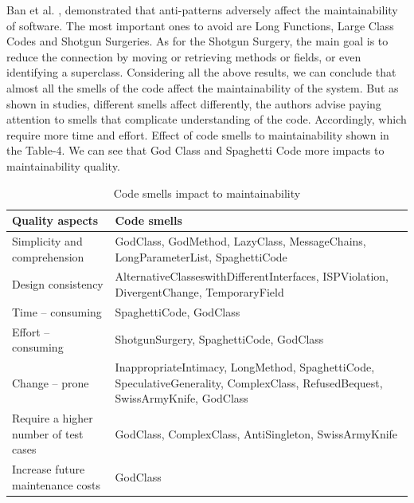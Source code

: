 \documentclass{sigchi}
\begin{document}
Ban et al. \cite{Ban}, demonstrated that anti-patterns adversely affect the maintainability of software. The most important ones to avoid are Long Functions, Large Class Codes and Shotgun Surgeries. As for the Shotgun Surgery, the main goal is to reduce the connection by moving or retrieving methods or fields, or even identifying a superclass.
Considering all the above results, we can conclude that almost all the smells of the code affect the maintainability of the system. But as shown in studies, different smells affect differently, the authors advise paying attention to smells that complicate understanding of the code. Accordingly, which require more time and effort. Effect of code smells to maintainability shown in the Table-4. We can see that God Class and Spaghetti Code more impacts to maintainability quality.

\begin{table}[h]
	\small
	\begin{tabular}{ p{35mm} |  p{45mm}}
		\toprule
		\textbf{Quality aspects} & \textbf{Code smells}\\
		\midrule
		Simplicity and comprehension & GodClass, GodMethod, LazyClass, MessageChains, LongParameterList, SpaghettiCode\\
		Design consistency  & AlternativeClasseswithDifferentInterfaces, ISPViolation, DivergentChange, TemporaryField\\
		Time – consuming & SpaghettiCode, GodClass\\
		Effort – consuming & ShotgunSurgery, SpaghettiCode, GodClass \\
		Change – prone & InappropriateIntimacy, LongMethod, SpaghettiCode, SpeculativeGenerality, ComplexClass, RefusedBequest, SwissArmyKnife, GodClass \\
		Require a higher number of test cases & GodClass, ComplexClass, AntiSingleton, SwissArmyKnife \\
		Increase future maintenance costs & GodClass \\
		\bottomrule
	\end{tabular}
	\caption{Code smells impact to maintainability }~\label{tab:in_ex_criteria}
\end{table}
\end{document}
